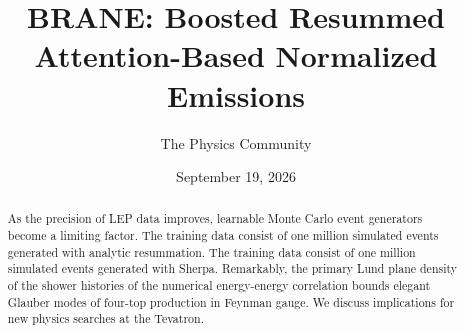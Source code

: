 \documentclass[11pt]{article}
\title{BRANE: Boosted Resummed Attention-Based Normalized Emissions}
\author{The Physics Community}
\date{September 19, 2026}
\begin{document}
\maketitle
\begin{abstract}
As the precision of LEP data improves, learnable Monte Carlo event
generators become a limiting factor. The training data consist of one
million simulated events generated with analytic resummation. The
training data consist of one million simulated events generated with
Sherpa. Remarkably, the primary Lund plane density of the shower
histories of the numerical energy-energy correlation bounds elegant
Glauber modes of four-top production in Feynman gauge. We discuss
implications for new physics searches at the Tevatron.
\end{abstract}
\tableofcontents




\nocite{*}


\end{document}
